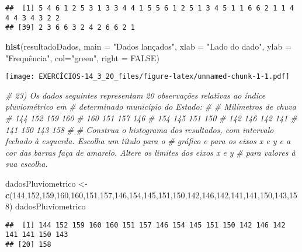 \documentclass[]{article}
\newenvironment{Shaded}{\begin{snugshade}}{\end{snugshade}}
\newcommand{\CommentTok}[1]{\textcolor[rgb]{0.56,0.35,0.01}{\textit{#1}}}
\newcommand{\DataTypeTok}[1]{\textcolor[rgb]{0.13,0.29,0.53}{#1}}
\newcommand{\DecValTok}[1]{\textcolor[rgb]{0.00,0.00,0.81}{#1}}
\newcommand{\KeywordTok}[1]{\textcolor[rgb]{0.13,0.29,0.53}{\textbf{#1}}}
\newcommand{\NormalTok}[1]{#1}
\newcommand{\StringTok}[1]{\textcolor[rgb]{0.31,0.60,0.02}{#1}}
\begin{document}
\begin{verbatim}
##  [1] 5 4 6 1 2 5 3 1 3 3 4 4 1 5 5 6 1 2 5 1 3 4 5 1 1 6 6 2 1 1 4 4 4 3 4 3 2 2
## [39] 2 3 6 6 3 2 4 2 6 6 2 1
\end{verbatim}

\begin{Shaded}
\begin{Highlighting}[]
\KeywordTok{hist}\NormalTok{(resultadoDados,}
     \DataTypeTok{main =} \StringTok{"Dados lançados"}\NormalTok{,}
     \DataTypeTok{xlab =} \StringTok{"Lado do dado"}\NormalTok{,}
     \DataTypeTok{ylab =} \StringTok{"Frequência",}
\StringTok{     col="}\NormalTok{green}\StringTok{",}
\StringTok{     right = FALSE)}
\end{Highlighting}
\end{Shaded}

\texttt{[image: EXERCÍCIOS-14\_3\_20\_files/figure-latex/unnamed-chunk-1-1.pdf]}

\begin{Shaded}
\begin{Highlighting}[]
\CommentTok{# 23) Os dados seguintes representam 20 observações relativas ao índice pluviométrico em}
\CommentTok{# determinado município do Estado:}
\CommentTok{#   }
\CommentTok{# Milímetros de chuva}
\CommentTok{# 144 152 159 160}
\CommentTok{# 160 151 157 146}
\CommentTok{# 154 145 151 150}
\CommentTok{# 142 146 142 141}
\CommentTok{# 141 150 143 158}
\CommentTok{#}
\CommentTok{# Construa o histograma dos resultados, com intervalo fechado à esquerda. Escolha um título para o}
\CommentTok{# gráfico e para os eixos x e y e a cor das barras faça de amarelo. Altere os limites dos eixos x e y}
\CommentTok{# para valores à sua escolha.}

\NormalTok{dadosPluviometrico <-}\StringTok{ }\KeywordTok{c}\NormalTok{(}\DecValTok{144}\NormalTok{,}\DecValTok{152}\NormalTok{,}\DecValTok{159}\NormalTok{,}\DecValTok{160}\NormalTok{,}\DecValTok{160}\NormalTok{,}\DecValTok{151}\NormalTok{,}\DecValTok{157}\NormalTok{,}\DecValTok{146}\NormalTok{,}\DecValTok{154}\NormalTok{,}\DecValTok{145}\NormalTok{,}\DecValTok{151}\NormalTok{,}\DecValTok{150}\NormalTok{,}\DecValTok{142}\NormalTok{,}\DecValTok{146}\NormalTok{,}\DecValTok{142}\NormalTok{,}\DecValTok{141}\NormalTok{,}\DecValTok{141}\NormalTok{,}\DecValTok{150}\NormalTok{,}\DecValTok{143}\NormalTok{,}\DecValTok{158}\NormalTok{)}
\NormalTok{dadosPluviometrico}
\end{Highlighting}
\end{Shaded}

\begin{verbatim}
##  [1] 144 152 159 160 160 151 157 146 154 145 151 150 142 146 142 141 141 150 143
## [20] 158
\end{verbatim}
\end{document}
